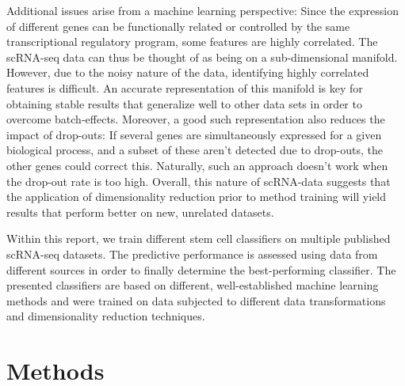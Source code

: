 \documentclass[10pt,conference,compsocconf]{IEEEtran}
\begin{document}
\par
Additional issues arise from a machine learning perspective: Since the expression of different genes can be functionally related or controlled by the same transcriptional regulatory program, some features are highly correlated. The scRNA-seq data can thus be thought of as being on a sub-dimensional manifold. However, due to the noisy nature of the data, identifying highly correlated features is difficult. An accurate representation of this manifold is key for obtaining stable results that generalize well to other data sets in order to overcome batch-effects. Moreover, a good such representation also reduces the impact of drop-outs: If several genes are simultaneously expressed for a given biological process, and a subset of these aren't detected due to drop-outs, the other genes could correct this. Naturally, such an approach doesn't work when the drop-out rate is too high. Overall, this nature of scRNA-data suggests that the application of dimensionality reduction prior to method training will yield results that perform better on new, unrelated datasets.
\par
Within this report, we train different stem cell classifiers on multiple published scRNA-seq datasets. The predictive performance is assessed using data from different sources in order to finally determine the best-performing classifier. The presented classifiers are based on different, well-established machine learning methods and were trained on data subjected to different data transformations and dimensionality reduction techniques.

\section*{Methods}
\end{document}
